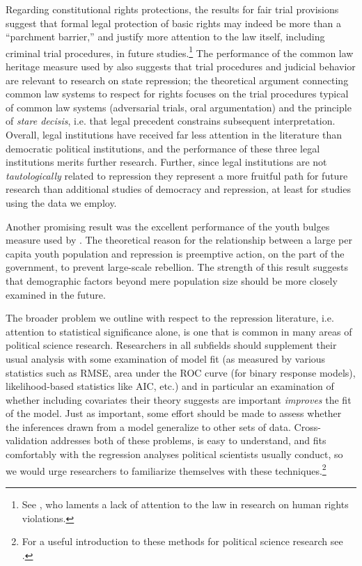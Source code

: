 \documentclass[12pt]{article}
\begin{document}
Regarding constitutional rights protections, the results for fair trial provisions suggest that formal legal protection of basic rights may indeed be more than a ``parchment barrier,'' \citep[See][]{KeithTatePoe2009} and justify more attention to the law itself, including criminal trial procedures, in future studies.\footnote{See \citet{Cross1999}, who laments a lack of attention to the law in research on human rights violations.} The performance of the common law heritage measure used by \citet{Mitchell2013} also suggests that trial procedures and judicial behavior are relevant to research on state repression; the theoretical argument connecting common law systems to respect for rights focuses on the trial procedures typical of common law systems (adversarial trials, oral argumentation) and the principle of {\em stare decisis}, i.e. that legal precedent constrains subsequent interpretation. Overall, legal institutions have received far less attention in the literature than democratic political institutions, and the performance of these three legal institutions merits further research. Further, since legal institutions are not {\it tautologically} related to repression they represent a more fruitful path for future research than additional studies of democracy and repression, at least for studies using the data we employ. 

Another promising result was the excellent performance of the youth bulges measure used by \citet{NordasDavenport2013}. The theoretical reason for the relationship between a large per capita youth population and repression is preemptive action, on the part of the government, to prevent large-scale rebellion. The strength of this result suggests that demographic factors beyond mere population size should be more closely examined in the future. 

The broader problem we outline with respect to the repression literature, i.e. attention to statistical significance alone, is one that is common in many areas of political science research. Researchers in all subfields should supplement their usual analysis with some examination of model fit (as measured by various statistics such as RMSE, area under the ROC curve (for binary response models), likelihood-based statistics like AIC, etc.) and in particular an examination of whether including covariates their theory suggests are important {\em improves} the fit of the model. Just as important, some effort should be made to assess whether the inferences drawn from a model generalize to other sets of data. Cross-validation addresses both of these problems, is easy to understand, and fits comfortably with the regression analyses political scientists usually conduct, so we would urge researchers to familiarize themselves with these techniques.\footnote{For a useful introduction to these methods for political science research see \citet{LeeAhlquist2011}.} 
\end{document}
